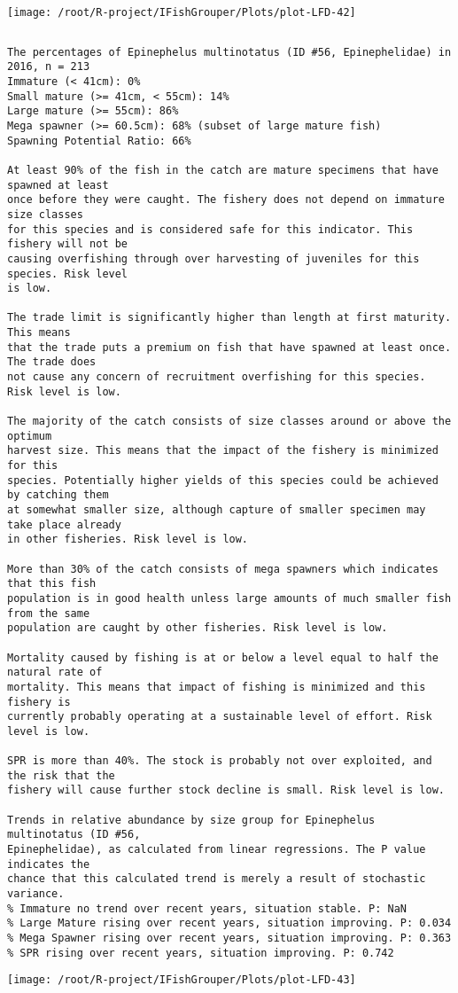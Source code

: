 \documentclass{report}\usepackage[]{graphicx}\usepackage[]{color}
\makeatletter
\def\maxwidth{ %
  \ifdim\Gin@nat@width>\linewidth
    \linewidth
  \else
    \Gin@nat@width
  \fi
}
\newenvironment{kframe}{%
 \def\at@end@of@kframe{}%
 \ifinner\ifhmode%
  \def\at@end@of@kframe{\end{minipage}}%
  \begin{minipage}{\columnwidth}%
 \fi\fi%
 \def\FrameCommand##1{\hskip\@totalleftmargin \hskip-\fboxsep
 \colorbox{shadecolor}{##1}\hskip-\fboxsep
     \hskip-\linewidth \hskip-\@totalleftmargin \hskip\columnwidth}%
 \MakeFramed {\advance\hsize-\width
   \@totalleftmargin\z@ \linewidth\hsize
   \@setminipage}}%
 {\par\unskip\endMakeFramed%
 \at@end@of@kframe}
\newenvironment{knitrout}{}{} %
\makeatother
\begin{document}
\begin{knitrout}
\texttt{[image: /root/R-project/IFishGrouper/Plots/plot-LFD-42]} 
\begin{kframe}\begin{verbatim}
\end{verbatim}
\end{kframe}
\clearpage
\newpage
\begin{kframe}\begin{verbatim}The percentages of Epinephelus multinotatus (ID #56, Epinephelidae) in 2016, n = 213
Immature (< 41cm): 0%
Small mature (>= 41cm, < 55cm): 14%
Large mature (>= 55cm): 86%
Mega spawner (>= 60.5cm): 68% (subset of large mature fish)
Spawning Potential Ratio: 66%
 
At least 90% of the fish in the catch are mature specimens that have spawned at least
once before they were caught. The fishery does not depend on immature size classes
for this species and is considered safe for this indicator. This fishery will not be
causing overfishing through over harvesting of juveniles for this species. Risk level
is low.

The trade limit is significantly higher than length at first maturity.  This means
that the trade puts a premium on fish that have spawned at least once. The trade does
not cause any concern of recruitment overfishing for this species. Risk level is low.

The majority of the catch consists of size classes around or above the optimum
harvest size. This means that the impact of the fishery is minimized for this
species. Potentially higher yields of this species could be achieved by catching them
at somewhat smaller size, although capture of smaller specimen may take place already
in other fisheries. Risk level is low.

More than 30% of the catch consists of mega spawners which indicates that this fish
population is in good health unless large amounts of much smaller fish from the same
population are caught by other fisheries. Risk level is low.
 
Mortality caused by fishing is at or below a level equal to half the natural rate of
mortality. This means that impact of fishing is minimized and this fishery is
currently probably operating at a sustainable level of effort. Risk level is low.
 
SPR is more than 40%. The stock is probably not over exploited, and the risk that the
fishery will cause further stock decline is small. Risk level is low.
 
Trends in relative abundance by size group for Epinephelus multinotatus (ID #56,
Epinephelidae), as calculated from linear regressions. The P value indicates the
chance that this calculated trend is merely a result of stochastic variance.
% Immature no trend over recent years, situation stable. P: NaN
% Large Mature rising over recent years, situation improving. P: 0.034
% Mega Spawner rising over recent years, situation improving. P: 0.363
% SPR rising over recent years, situation improving. P: 0.742
\end{verbatim}
\end{kframe}
\texttt{[image: /root/R-project/IFishGrouper/Plots/plot-LFD-43]} 


\end{knitrout}
\end{document}
